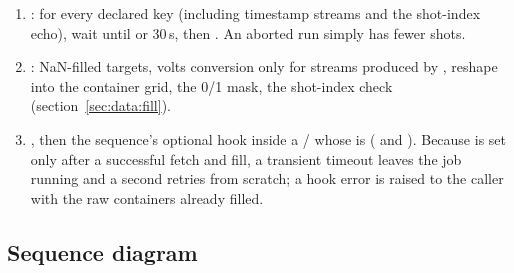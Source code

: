 \begin{enumerate}[nosep]
  \item {}: for every declared key (including timestamp
    streams and the shot-index echo), wait until
     or
    30\,s, then . An aborted run simply has fewer shots.
  \item {}: NaN-filled targets, volts conversion only for
    streams produced by , reshape into the container grid,
    the 0/1 mask, the shot-index check (section~\ref{sec:data:fill}).
  \item {}, then the sequence's optional
     hook inside a / whose
     is  ( and
    ). Because  is set only after a
    successful fetch and fill, a transient timeout leaves the job running
    and a second  retries from scratch; a hook error is raised
    to the caller with the raw containers already filled.
\end{enumerate}

\subsection{Sequence diagram}


